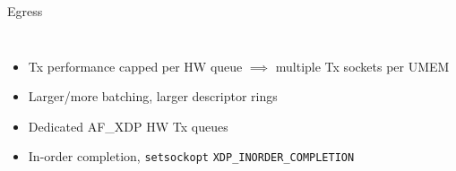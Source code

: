 \documentclass[aspectratio=169, xcolor=table]{beamer}
\begin{document}
  \begin{frame}{Egress}
  \begin{columns}[T,onlytextwidth]
    \begin{itemize}
    \item Tx performance capped per HW queue $\implies$ multiple Tx
      sockets per UMEM
    \item Larger/more batching, larger descriptor rings
    \item Dedicated AF\_XDP HW Tx queues
    \item In-order completion, {\tt setsockopt} {\tt XDP\_INORDER\_COMPLETION}
    \end{itemize}
    \centering{}
    \end{columns}
  \end{frame}
\end{document}
